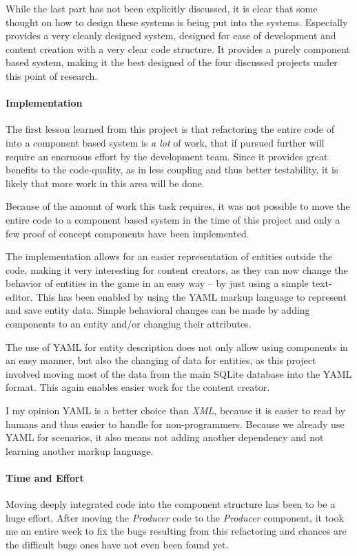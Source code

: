 While the last part has not been explicitly discussed, it is clear that some thought on how to design these systems is
being put into the systems. Especially \AD{} provides a very cleanly designed system, designed for ease of development
and content creation with a very clear code structure.
It provides a purely component based system, making it the best designed of the four discussed projects under this point
of research.

\paragraph{Implementation}
The first lesson learned from this project is that refactoring the entire code of \UH{} into a component based system is
\textit{a lot} of work, that if pursued further will require an enormous effort by the development team. Since it provides
great benefits to the code-quality, as in less coupling and thus better testability, it is likely that more work in this
area will be done.


Because of the amount of work this task requires, it was not possible to move the entire code to a
component based system in the time of this project and only a few proof of concept components have been implemented.

The implementation allows for an easier representation of entities outside the code, making it very interesting
for content creators, as they can now change the behavior of entities in the game in an easy way -- by just using a simple
text-editor. This has been enabled by using the YAML markup language to represent and save entity data. Simple
behavioral changes can be made by adding components to an entity and/or changing their attributes.

The use of YAML for entity description does not only allow using components in an easy manner, but also the changing of
data for entities, as this project involved moving most of the data from the main SQLite database into the YAML format.
This again enables easier work for the content creator.

I my opinion YAML is a better choice than \textit{XML}, because it is easier to read by humans and thus easier to handle
for non-programmers. Because we already use YAML for scenarios, it also means not adding another dependency and not
learning another markup language.

\paragraph{Time and Effort}
Moving deeply integrated code into the component structure has been to be a huge effort. After moving the
\textit{Producer} code to the \textit{Producer} component, it took me an entire week to fix the bugs resulting from this
refactoring and chances are the difficult bugs ones have not even been found yet.

